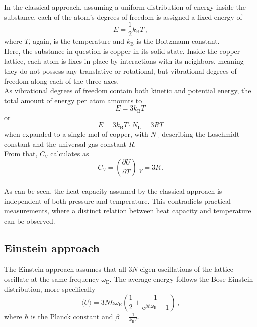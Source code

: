 In the classical approach, assuming a uniform distribution of energy inside the substance, each of the atom's degrees of freedom is assigned a fixed energy of
\begin{equation*}
    E = \frac{1}{2} k_\text{B} T \,,
\end{equation*}
where $T$, again, is the temperature and $k_\text{B}$ is the Boltzmann constant. \\

Here, the substance in question is copper in its solid state.
Inside the copper lattice, each atom is fixes in place by interactions with its neighbors, meaning they do not possess any translative or rotational, but vibrational degrees of freedom along each of the three axes. \\
As vibrational degrees of freedom contain both kinetic and potential energy, the total amount of energy per atom amounts to
\begin{equation*}
    E = 3 k_\text{B} T \,
\end{equation*}
or
\begin{equation*}
    E = 3 k_\text{B} T \cdot N_\text{L} = 3 R T
\end{equation*}
when expanded to a single mol of copper, with $N_\text{L}$ describing the Loschmidt constant and the universal gas constant $R$.\\
From that, $C_V$ calculates as
\begin{equation*}
    C_V = \left( \frac{\partial U}{\partial T} \right) \big \vert _V = 3 R \,.
\end{equation*} \\

As can be seen, the heat capacity assumed by the classical approach is independent of both pressure and temperature.
This contradicts practical measurements, where a distinct relation between heat capacity and temperature can be observed. 

\subsection{Einstein approach}

The Einstein approach assumes that all $3N$ eigen oscillations of the lattice oscillate at the same frequency $\omega_\text{E}$.
The average energy follows the Bose-Einstein distribution, more specifically
\begin{equation*}
   \langle U \rangle = 3 N \hbar \omega_\text{E} \left(\frac{1}{2} + \frac{1}{\text{e}^{\beta \hbar \omega_\text{E}} - 1} \right) \,,
\end{equation*}
where $\hbar$ is the Planck constant and $\beta = \frac{1}{k_\text{B} T}$. \\

